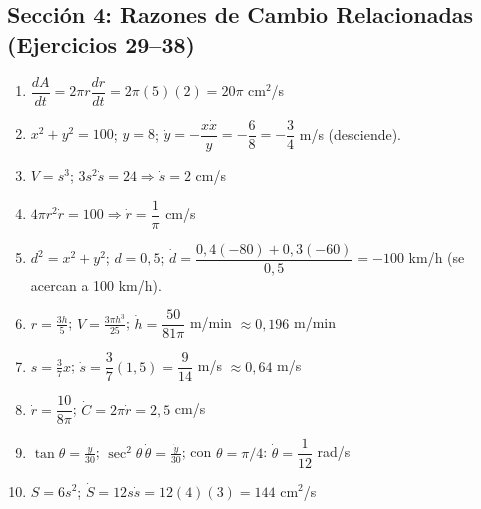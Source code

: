 \documentclass[12pt, letterpaper]{article}
\begin{document}
  \subsection*{Sección 4: Razones de Cambio Relacionadas (Ejercicios 29--38)}
  \begin{enumerate}[resume=respuestas, leftmargin=*, label=\textbf{\arabic*.}]
    \item $\dfrac{dA}{dt} = 2\pi r \dfrac{dr}{dt} = 2\pi(5)(2) = 20\pi$ cm$^2$/s
    \item $x^2 + y^2 = 100$; $y = 8$; $\dot{y} = -\dfrac{x\dot{x}}{y} = -\dfrac{6}{8} = -\dfrac{3}{4}$ m/s (desciende).
    \item $V = s^3$; $3s^2 \dot{s} = 24 \Rightarrow \dot{s} = 2$ cm/s
    \item $4\pi r^2 \dot{r} = 100 \Rightarrow \dot{r} = \dfrac{1}{\pi}$ cm/s
    \item $d^2 = x^2 + y^2$; $d = 0{,}5$; $\dot{d} = \dfrac{0{,}4(-80) + 0{,}3(-60)}{0{,}5} = -100$ km/h (se acercan a 100 km/h).
    \item $r = \frac{3h}{5}$; $V = \frac{3\pi h^3}{25}$; $\dot{h} = \dfrac{50}{81\pi}$ m/min $\approx 0{,}196$ m/min
    \item $s = \frac{3}{7}x$; $\dot{s} = \dfrac{3}{7}(1{,}5) = \dfrac{9}{14}$ m/s $\approx 0{,}64$ m/s
    \item $\dot{r} = \dfrac{10}{8\pi}$; $\dot{C} = 2\pi\dot{r} = 2{,}5$ cm/s
    \item $\tan\theta = \frac{y}{30}$; $\sec^2\theta\,\dot{\theta} = \frac{\dot{y}}{30}$; con $\theta = \pi/4$: $\dot{\theta} = \dfrac{1}{12}$ rad/s
    \item $S = 6s^2$; $\dot{S} = 12s\dot{s} = 12(4)(3) = 144$ cm$^2$/s
  \end{enumerate}
\end{document}
